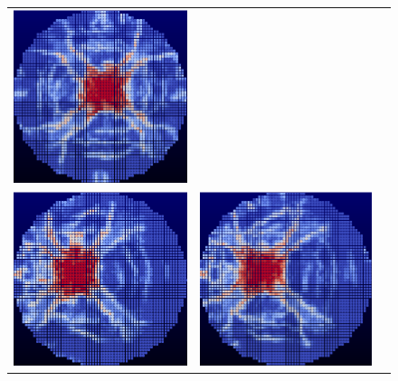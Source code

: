 \begin{figure}
\begin{tabular}{ccc}
  \includegraphics[scale=0.75]{figure/New_Solutions/true_soln_1512.eps} \\
  \includegraphics[scale=0.75]{figure/New_Solutions/true_soln_19049.eps} &
  \includegraphics[scale=0.75]{figure/New_Solutions/true_soln_19050.eps} &

\end{tabular}
\end{figure}
